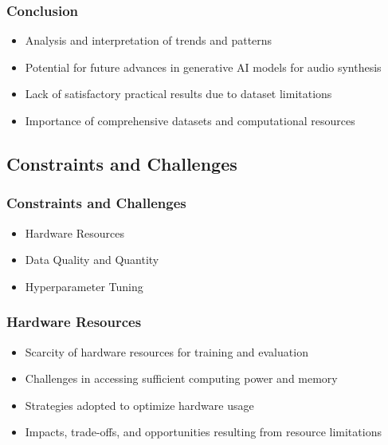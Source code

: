 \begin{frame}
    \frametitle{Conclusion}

    \begin{itemize}
        \item Analysis and interpretation of trends and patterns
        \item Potential for future advances in generative AI models for audio synthesis
        \item Lack of satisfactory practical results due to dataset limitations
        \item Importance of comprehensive datasets and computational resources
    \end{itemize}
    
\end{frame}

\subsection{Constraints and Challenges}

\begin{frame}
    \frametitle{Constraints and Challenges}
    
    \begin{itemize}
        \item Hardware Resources
        \item Data Quality and Quantity
        \item Hyperparameter Tuning
    \end{itemize}
    
\end{frame}

\begin{frame}
    \frametitle{Hardware Resources}

    \begin{itemize}
        \item Scarcity of hardware resources for training and evaluation
        \item Challenges in accessing sufficient computing power and memory
        \item Strategies adopted to optimize hardware usage
        \item Impacts, trade-offs, and opportunities resulting from resource limitations
    \end{itemize}
    
\end{frame}


